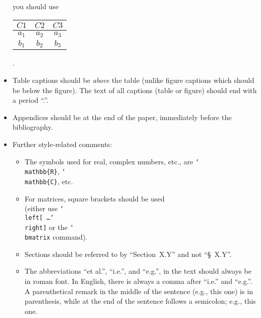 \documentclass{scrartcl}
\begin{document}
\begin{itemize}
you should use\\

\hspace{2cm}\begin{tabular}{c|c|c}
$C1$ & $C2$ & $C3$ \\ \hline
$a_1$ & $a_2$ & $a_3$ \\
$b_1$ & $b_2$ & $b_3$
\end{tabular}.\\

\item Table captions should be \emph{above} the table (unlike figure captions
  which should be below the figure). The text of all captions (table or figure)
  should end with a period ``.''.

\item Appendices should be at the end of the paper, immediately before the
bibliography.

\item Further style-related comments:
\begin{itemize}
\item The symbols used for real, complex numbers, etc.,
are \texttt{{\char`\\mathbb\{R\}}}, \texttt{{\char`\\mathbb\{C\}}}, etc.
%
\item For matrices, square brackets should be used \\
(either use
\texttt{\char`\\left[ \dots \char`\\right]} or the \texttt{\char`\\bmatrix}
command).
%
\item Sections should be referred to by ``Section~X.Y'' and not ``\S~X.Y''.
%
\item The abbreviations ``et al.'', ``i.e.'', and ``e.g.'', in the text
should always be in roman font.
In English, there is always a comma after ``i.e.'' and ``e.g.''.
%
A parenthetical remark in the middle of the sentence (e.g., this one) is in
parenthesis, while at the end of the sentence follows a semicolon; e.g., this
one.
%
\end{itemize}
\end{itemize}
\end{document}
